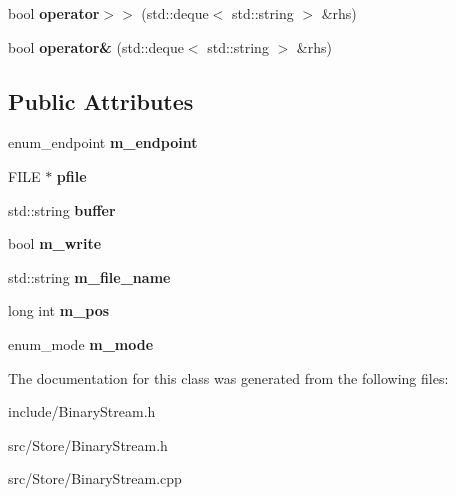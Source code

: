 \begin{DoxyCompactItemize}
\item 
\hypertarget{classBinaryStream_a13827a06ad9d0321a30c8e4a460aefd1}{bool {\bfseries operator$>$$>$} (std\-::deque$<$ std\-::string $>$ \&rhs)}\label{classBinaryStream_a13827a06ad9d0321a30c8e4a460aefd1}

\item 
\hypertarget{classBinaryStream_a80b6b47ffd83d312c343556b9c52f0b8}{bool {\bfseries operator\&} (std\-::deque$<$ std\-::string $>$ \&rhs)}\label{classBinaryStream_a80b6b47ffd83d312c343556b9c52f0b8}

\end{DoxyCompactItemize}
\subsection*{Public Attributes}
\begin{DoxyCompactItemize}
\item 
\hypertarget{classBinaryStream_a056258a29881cd6d53b271ac9d77fe7c}{enum\-\_\-endpoint {\bfseries m\-\_\-endpoint}}\label{classBinaryStream_a056258a29881cd6d53b271ac9d77fe7c}

\item 
\hypertarget{classBinaryStream_a88acd60c17fe346abf420f3ce9960f91}{F\-I\-L\-E $\ast$ {\bfseries pfile}}\label{classBinaryStream_a88acd60c17fe346abf420f3ce9960f91}

\item 
\hypertarget{classBinaryStream_a9b47384e855aaac8fa9d55f49e8fbe95}{std\-::string {\bfseries buffer}}\label{classBinaryStream_a9b47384e855aaac8fa9d55f49e8fbe95}

\item 
\hypertarget{classBinaryStream_a71ae465f16d2d66c559abab48e7ab1c6}{bool {\bfseries m\-\_\-write}}\label{classBinaryStream_a71ae465f16d2d66c559abab48e7ab1c6}

\item 
\hypertarget{classBinaryStream_a791a88624d85fd9f48ba4ee85948f9e8}{std\-::string {\bfseries m\-\_\-file\-\_\-name}}\label{classBinaryStream_a791a88624d85fd9f48ba4ee85948f9e8}

\item 
\hypertarget{classBinaryStream_a98516726606b927c4178c0b449781695}{long int {\bfseries m\-\_\-pos}}\label{classBinaryStream_a98516726606b927c4178c0b449781695}

\item 
\hypertarget{classBinaryStream_a1f5e15f43725da5773b20169b07c689f}{enum\-\_\-mode {\bfseries m\-\_\-mode}}\label{classBinaryStream_a1f5e15f43725da5773b20169b07c689f}

\end{DoxyCompactItemize}


The documentation for this class was generated from the following files\-:\begin{DoxyCompactItemize}
\item 
include/Binary\-Stream.\-h\item 
src/\-Store/Binary\-Stream.\-h\item 
src/\-Store/Binary\-Stream.\-cpp\end{DoxyCompactItemize}
